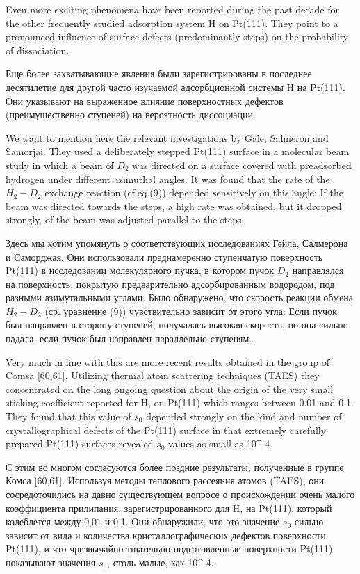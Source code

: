 \documentclass[11pt]{article}
\begin{document}
Even more exciting phenomena have been reported during the past decade
for the other frequently studied adsorption system H on Pt(111). They
point to a pronounced influence of surface defects (predominantly steps)
on the probability of dissociation.

Еще более захватывающие явления были зарегистрированы в последнее
десятилетие для другой часто изучаемой адсорбционной системы H на
Pt(111). Они указывают на выраженное влияние поверхностных дефектов
(преимущественно ступеней) на вероятность диссоциации.

We want to mention here the relevant investigations by Gale, Salmeron
and Samorjai. They used a deliberately stepped Pt(111) surface in a
molecular beam study in which a beam of \(D_2\) was directed on a
surface covered with preadsorbed hydrogen under different azimuthal
angles. It was found that the rate of the \(H_2-D_2\) exchange reaction
(cf.eq.(9)) depended sensitively on this angle: If the beam was directed
towards the steps, a high rate was obtained, but it dropped strongly, of
the beam was adjusted parallel to the steps.

Здесь мы хотим упомянуть о соответствующих исследованиях Гейла,
Салмерона и Саморджая. Они использовали преднамеренно ступенчатую
поверхность Pt(111) в исследовании молекулярного пучка, в котором пучок
\(D_2\) направлялся на поверхность, покрытую предварительно
адсорбированным водородом, под разными азимутальными углами. Было
обнаружено, что скорость реакции обмена \(H_2-D_2\) (ср. уравнение (9))
чувствительно зависит от этого угла: Если пучок был направлен в сторону
ступеней, получалась высокая скорость, но она сильно падала, если пучок
был направлен параллельно ступеням.

    Very much in line with this are more recent results obtained in the
group of Comsa {[}60,61{]}. Utilizing thermal atom scattering techniques
(TAES) they concentrated on the long ongoing question about the origin
of the very small sticking coefficient reported for H, on Pt(111) which
ranges between 0.01 and 0.1. They found that this value of \(s_0\)
depended strongly on the kind and number of crystallographical defects
of the Pt(111) surface in that extremely carefully prepared Pt(111)
surfaces revealed \(s_0\) values as small as 10\^{}-4.

С этим во многом согласуются более поздние результаты, полученные в
группе Комса {[}60,61{]}. Используя методы теплового рассеяния атомов
(TAES), они сосредоточились на давно существующем вопросе о
происхождении очень малого коэффициента прилипания, зарегистрированного
для H, на Pt(111), который колеблется между 0,01 и 0,1. Они обнаружили,
что это значение \(s_0\) сильно зависит от вида и количества
кристаллографических дефектов поверхности Pt(111), и что чрезвычайно
тщательно подготовленные поверхности Pt(111) показывают значения
\(s_0\), столь малые, как 10\^{}-4.
\end{document}
